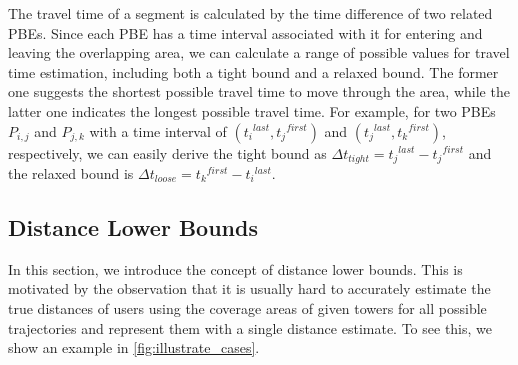 The travel time of a segment is calculated by the time difference of two related PBEs. Since each PBE has a time interval associated with it for entering and leaving the overlapping area, we can calculate a range of possible values for travel time estimation, including both a tight bound and a relaxed bound. The former one suggests the shortest possible travel time to move through the area, while the latter one indicates the longest possible travel time. For example, for two PBEs $P_{i,j}$ and $P_{j,k}$ with a time interval of $({t_i}^{last}, {t_j}^{first})$ and $({t_j}^{last}, {t_k}^{first})$, respectively, we can easily derive the tight bound as $\Delta t_{tight} = {t_j}^{last} - {t_j}^{first}$ and the relaxed bound is $\Delta t_{loose} = {t_k}^{first} - {t_i}^{last}$.

\subsection{Distance Lower Bounds}

In this section, we introduce the concept of distance lower bounds. This is motivated by the observation that it is usually hard to accurately estimate the true distances of users using the coverage areas of given towers for all possible trajectories and represent them with a single distance estimate. To see this, we show an example in \autoref{fig:illustrate_cases}.


